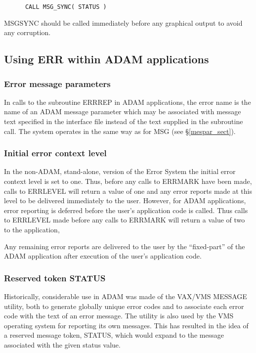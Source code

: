 \documentclass[twoside,11pt]{article}
\newcommand{\htmlref}[2]{#1}
\newcommand{\latex}[1]{#1}
\newcommand{\xlabel}[1]{}
\renewcommand{\_}{\texttt{\symbol{95}}}
\begin{document}
\begin {small}
\begin{verbatim}
      CALL MSG_SYNC( STATUS )
\end{verbatim}
\end {small}

MSG\_SYNC should be called immediately before any graphical output to avoid any
corruption. 


\subsection{\xlabel{using_err_within_adam_applications}Using ERR within ADAM applications \label{adam_err}}

\subsubsection{\xlabel{error_message_parameters}Error message parameters}

In calls to the subroutine ERR\_REP in ADAM applications, the error name is the
name of an ADAM message parameter which may be associated with message text
specified in the interface file instead of the text supplied in the subroutine
call.
The system operates in the same way as for
\htmlref{MSG}{mespar_sect}\latex{ (see \S\ref{mespar_sect})}.

\subsubsection{\xlabel{initial_error_context_level}Initial error context level}
In the non-ADAM, stand-alone, version of the Error System the initial error
context level is set to one.
Thus, before any calls to ERR\_MARK have been made, calls to ERR\_LEVEL will 
return a value of one and any error reports made at this level to be delivered
immediately to the user.
However, for ADAM applications, error reporting is deferred before
the user's application code is called.
Thus calls to ERR\_LEVEL made before any calls to ERR\_MARK will return a 
value of two to the application,

Any remaining error reports are delivered to the user by the ``fixed-part''
of the ADAM application after execution of
the user's application code.


\subsubsection{\xlabel{reserved_token_status}Reserved token STATUS \label{restok}}
Historically, considerable use in ADAM was made of the VAX/VMS MESSAGE utility, 
both to generate globally unique error codes and to associate each error code 
with the text of an error message.
The utility is also used by the VMS operating system for reporting 
its own messages.
This has resulted in the idea of
a reserved message token, STATUS, which would expand to the message associated
with the given status value.
\end{document}
